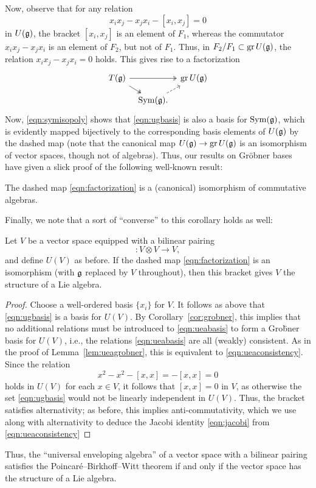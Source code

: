 Now, observe that for any relation
\begin{equation*}
x_ix_j-x_jx_i-[x_i,x_j]=0
\end{equation*}
in $U(\mathfrak{g})$, the bracket $[x_i,x_j]$ is an element of $F_1$, whereas the commutator $x_ix_j-x_jx_i$ is an element of $F_2$, but not of $F_1$. Thus, in $F_2/F_1\subset\operatorname{gr} U(\mathfrak{g})$, the relation $x_ix_j-x_jx_i=0$ holds. This gives rise to a factorization
\begin{equation}
\label{eqn:factorization}
\begin{tikzcd}[column sep=tiny,row sep=small]
T(\g)\arrow[rr,two heads]\arrow[rd,two heads]&&\gr U(\g)\\
&\Sym(\g).\arrow[ru,dashed]&
\end{tikzcd}
\end{equation}
Now, \eqref{eqn:symisopoly} shows that \eqref{eqn:ugbasis} is also a basis for $\operatorname{Sym}(\mathfrak{g})$, which is evidently mapped bijectively to the corresponding basis elements of $U(\mathfrak{g})$ by the dashed map (note that the canonical map $U(\mathfrak{g})\to\operatorname{gr} U(\mathfrak{g})$ is an isomorphism of vector spaces, though not of algebras). Thus, our results on Gr\"obner bases have given a slick proof of the following well-known result:

\begin{cor}
The dashed map \eqref{eqn:factorization} is a (canonical) isomorphism of commutative algebras.
\end{cor}

Finally, we note that a sort of ``converse'' to this corollary holds as well:

\begin{prop}
Let $V$ be a vector space equipped with a bilinear pairing
\begin{equation*}
[-,-]\colon V\otimes V\to V,
\end{equation*}
and define $U(V)$ as before. If the dashed map \eqref{eqn:factorization} is an isomorphism (with $\mathfrak{g}$ replaced by $V$ throughout), then this bracket gives $V$ the structure of a Lie algebra.
\end{prop}
\begin{proof}
Choose a well-ordered basis $\{x_i\}$ for $V$. It follows as above that \eqref{eqn:ugbasis} is a basis for $U(V)$. By Corollary~\ref{cor:grobner}, this implies that no additional relations must be introduced to \eqref{eqn:ueabasis} to form a Gro\"bner basis for $U(V)$, i.e., the relations \eqref{eqn:ueabasis} are all (weakly) consistent. As in the proof of Lemma~\ref{lem:ueagrobner}, this is equivalent to \eqref{eqn:ueaconsistency}. Since the relation
\begin{equation*}
x^2-x^2-[x,x]=-[x,x]=0
\end{equation*}
holds in $U(V)$ for each $x\in V$, it follows that $[x,x]=0$ in $V$, as otherwise the set \eqref{eqn:ugbasis} would not be linearly independent in $U(V)$. Thus, the bracket satisfies alternativity; as before, this implies anti-commutativity, which we use along with alternativity to deduce the Jacobi identity \eqref{eqn:jacobi} from \eqref{eqn:ueaconsistency}
\end{proof}

Thus, the ``universal enveloping algebra'' of a vector space with a bilinear pairing satisfies the Poincar\'e--Birkhoff--Witt theorem if and only if the vector space has the structure of a Lie algebra.

